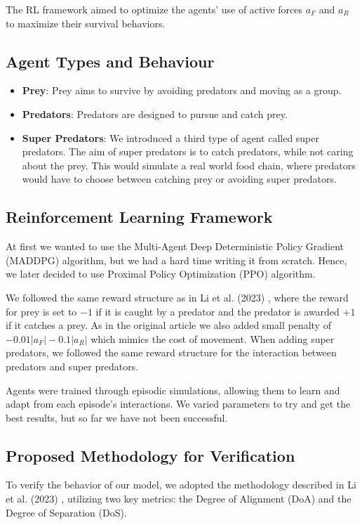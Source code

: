 \documentclass[9pt]{pnas-new}
\begin{document}
The RL framework aimed to optimize the agents' use of active forces \( a_F \) and \( a_R \) to maximize their survival behaviors.

\subsection{Agent Types and Behaviour}
\begin{itemize}
    \item \textbf{Prey}: Prey aims to survive by avoiding predators and moving as a group.
    \item \textbf{Predators}: Predators are designed to pursue and catch prey.
    \item \textbf{Super Predators}: We introduced a third type of agent called super predators. The aim of super predators is to catch predators, while not caring about the prey. This would simulate a real world food chain, where predators would have to choose between catching prey or avoiding super predators.
\end{itemize}

\subsection{Reinforcement Learning Framework} At first we wanted to use the Multi-Agent Deep Deterministic Policy Gradient (MADDPG) algorithm, but we had a hard time writing it from scratch. Hence, we later decided to use Proximal Policy Optimization (PPO) algorithm.

We followed the same reward structure as in Li et al. (2023) \cite{li2023predator}, where the reward for prey is set to $-1$ if it is caught by a predator and the predator is awarded $+1$ if it catches a prey. As in the original article we also added small penalty of $-0.01|a_F|-0.1|a_R|$ which mimics the cost of movement.
When adding super predators, we followed the same reward structure for the interaction between predators and super predators.

Agents were trained through episodic simulations, allowing them to learn and adapt from each episode's interactions. We varied parameters to try and get the best results, but so far we have not been successful.

\subsection*{Proposed Methodology for Verification}

To verify the behavior of our model, we adopted the methodology described in Li et al. (2023) \cite{li2023predator}, utilizing two key metrics: the Degree of Alignment (DoA) and the Degree of Separation (DoS).
\end{document}
